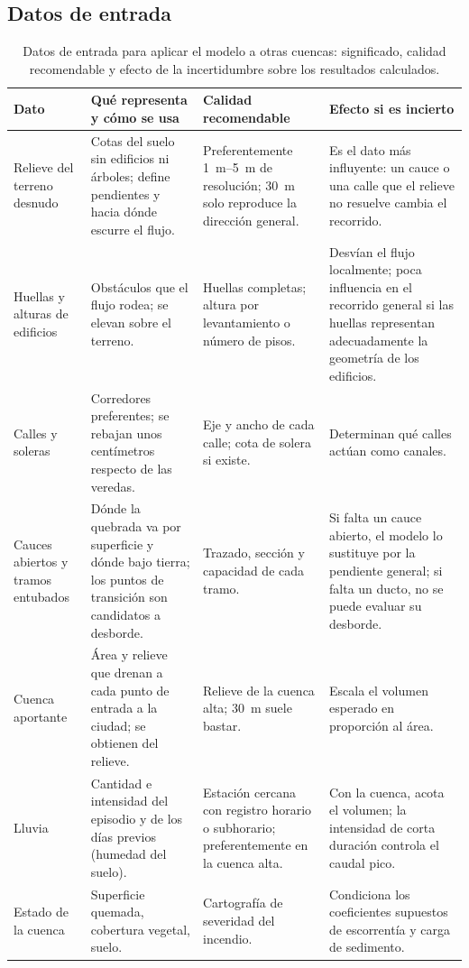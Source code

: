 \subsection*{Datos de entrada}
\begin{table}[htbp]\centering\small
\caption{Datos de entrada para aplicar el modelo a otras cuencas: significado, calidad recomendable y efecto de la incertidumbre sobre los resultados calculados.}\label{tab:transferencia}
\begin{tabular}{p{}p{}p{}p{}}\toprule
Dato & Qué representa y cómo se usa & Calidad recomendable & Efecto si es incierto\\\midrule
Relieve del terreno desnudo & Cotas del suelo sin edificios ni árboles; define pendientes y hacia dónde escurre el flujo. & Preferentemente \SIrange{1}{5}{m} de resolución; \SI{30}{m} solo reproduce la dirección general. & Es el dato más influyente: un cauce o una calle que el relieve no resuelve cambia el recorrido.\\
Huellas y alturas de edificios & Obstáculos que el flujo rodea; se elevan sobre el terreno. & Huellas completas; altura por levantamiento o número de pisos. & Desvían el flujo localmente; poca influencia en el recorrido general si las huellas representan adecuadamente la geometría de los edificios.\\
Calles y soleras & Corredores preferentes; se rebajan unos centímetros respecto de las veredas. & Eje y ancho de cada calle; cota de solera si existe. & Determinan qué calles actúan como canales.\\
Cauces abiertos y tramos entubados & Dónde la quebrada va por superficie y dónde bajo tierra; los puntos de transición son candidatos a desborde. & Trazado, sección y capacidad de cada tramo. & Si falta un cauce abierto, el modelo lo sustituye por la pendiente general; si falta un ducto, no se puede evaluar su desborde.\\
Cuenca aportante & Área y relieve que drenan a cada punto de entrada a la ciudad; se obtienen del relieve. & Relieve de la cuenca alta; \SI{30}{m} suele bastar. & Escala el volumen esperado en proporción al área.\\
Lluvia & Cantidad e intensidad del episodio y de los días previos (humedad del suelo). & Estación cercana con registro horario o subhorario; preferentemente en la cuenca alta. & Con la cuenca, acota el volumen; la intensidad de corta duración controla el caudal pico.\\
Estado de la cuenca & Superficie quemada, cobertura vegetal, suelo. & Cartografía de severidad del incendio. & Condiciona los coeficientes supuestos de escorrentía y carga de sedimento.\\

\end{tabular}
\end{table}
